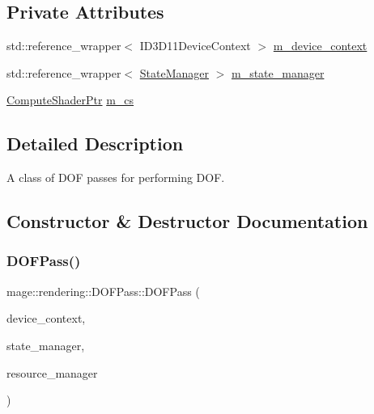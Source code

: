 \subsection*{Private Attributes}
\begin{DoxyCompactItemize}
\item 
std\+::reference\+\_\+wrapper$<$ I\+D3\+D11\+Device\+Context $>$ \hyperlink{classmage_1_1rendering_1_1_d_o_f_pass_a53f1f35ccb35c6e4f46ab4349acc768f}{m\+\_\+device\+\_\+context}
\item 
std\+::reference\+\_\+wrapper$<$ \hyperlink{classmage_1_1rendering_1_1_state_manager}{State\+Manager} $>$ \hyperlink{classmage_1_1rendering_1_1_d_o_f_pass_a41e42d238a1d7471626de8891e5f9ab7}{m\+\_\+state\+\_\+manager}
\item 
\hyperlink{namespacemage_1_1rendering_ab3dc9f2114f2e9255b91d9c051da52ea}{Compute\+Shader\+Ptr} \hyperlink{classmage_1_1rendering_1_1_d_o_f_pass_aad575c41dc3427fee1135b68d3d680ce}{m\+\_\+cs}
\end{DoxyCompactItemize}


\subsection{Detailed Description}
A class of D\+OF passes for performing D\+OF. 

\subsection{Constructor \& Destructor Documentation}
\hypertarget{classmage_1_1rendering_1_1_d_o_f_pass_a5dcf32906eadc564a8ee6331bdee5def}{}\label{classmage_1_1rendering_1_1_d_o_f_pass_a5dcf32906eadc564a8ee6331bdee5def} 
\subsubsection{\texorpdfstring{D\+O\+F\+Pass()}{DOFPass()}\hspace{0.1cm}{\footnotesize\ttfamily [1/3]}}
{\footnotesize\ttfamily mage\+::rendering\+::\+D\+O\+F\+Pass\+::\+D\+O\+F\+Pass (\begin{DoxyParamCaption}\item[{I\+D3\+D11\+Device\+Context \&}]{device\+\_\+context,  }\item[{\hyperlink{classmage_1_1rendering_1_1_state_manager}{State\+Manager} \&}]{state\+\_\+manager,  }\item[{\hyperlink{classmage_1_1rendering_1_1_resource_manager}{Resource\+Manager} \&}]{resource\+\_\+manager }\end{DoxyParamCaption})\hspace{0.3cm}{\ttfamily [explicit]}}

